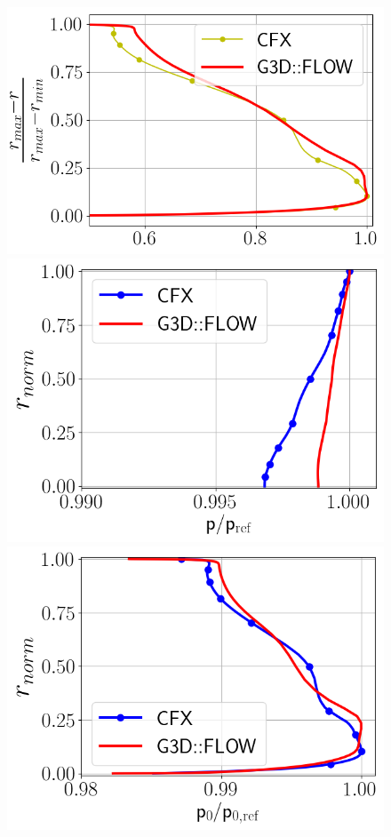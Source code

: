 \begin{figure}[h!]
  \centering
  \begin{minipage}{0.48\columnwidth}
  \includegraphics[width=1.\textwidth]{Figures/MaMave_NRT.png}
  \end{minipage}
  \begin{minipage}{0.48\columnwidth}
  \includegraphics[width=1.\textwidth]{Figures/PAave_NRT.png}
  \end{minipage}
  \begin{minipage}{0.48\columnwidth}
  \includegraphics[width=1.\textwidth]{Figures/P0Mave_NRT.png}

\end{minipage}
\end{figure}
